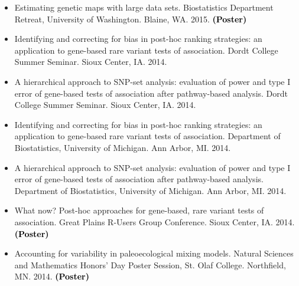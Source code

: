 \documentclass[margin]{res}
\newcommand{\annotate}[1]{\textcolor{black}{\textbf{(#1)}}}
\begin{document}
\begin{resume}
\begin{itemize}
\item[9.] %
Estimating genetic maps with large data sets. 
Biostatistics Department Retreat, University of Washington. Blaine, WA. 2015. 
\annotate{Poster}


\item[8.] %
Identifying and correcting for bias in post-hoc ranking strategies: an application to gene-based rare variant tests of association. 
Dordt College Summer Seminar. Sioux Center, IA. 2014.

\item[7.] %
A hierarchical approach to SNP-set analysis: evaluation of power and type I error of gene-based tests of association after pathway-based analysis. 
Dordt College Summer Seminar. Sioux Center, IA. 2014.

\item[6.] %
Identifying and correcting for bias in post-hoc ranking strategies: an application to gene-based rare variant tests of association. 
Department of Biostatistics, University of Michigan. Ann Arbor, MI. 2014.

\item[5.] %
A hierarchical approach to SNP-set analysis: evaluation of power and type I error of gene-based tests of association after pathway-based analysis. 
Department of Biostatistics, University of Michigan. Ann Arbor, MI. 2014.

\item[4.] %
What now? Post-hoc approaches for gene-based, rare variant tests of association. 
Great Plains R-Users Group Conference. Sioux Center, IA. 2014. 
\annotate{Poster}

\item[3.] %
Accounting for variability in paleoecological mixing models. 
Natural Sciences and Mathematics Honors’ Day Poster Session, St. Olaf College. Northfield, MN. 2014. 
\annotate{Poster}



\end{itemize}
\end{resume}
\end{document}
